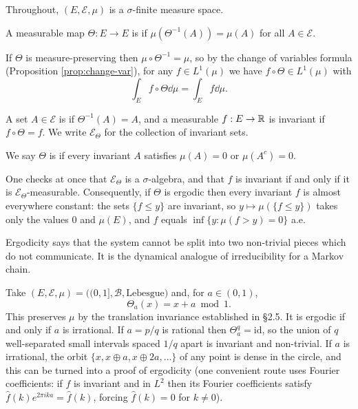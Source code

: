 \documentclass[a4paper]{scrartcl}
\newcommand{\cB}{\mathcal{B}}
\newcommand{\cE}{\mathcal{E}}
\begin{document}
Throughout, $(E,\cE,\mu)$ is a $\sigma$-finite measure space.

\begin{definition}
	A measurable map $\Theta : E \to E$ is  if $\mu(\Theta^{-1}(A))=\mu(A)$ for all $A \in \cE$.
\end{definition}

If $\Theta$ is measure-preserving then $\mu\circ\Theta^{-1}=\mu$, so by the change of variables formula (Proposition \ref{prop:change-var}), for any $f \in L^1(\mu)$ we have $f \circ \Theta \in L^1(\mu)$ with
$$
\int_E f\circ\Theta\dd\mu = \int_E f\dd\mu.
$$

\begin{definition}
	A set $A \in \cE$ is  if $\Theta^{-1}(A)=A$, and a measurable $f : E \to \mathbb{R}$ is invariant if $f\circ\Theta = f$. We write $\cE_\Theta$ for the collection of invariant sets.

	We say $\Theta$ is  if every invariant $A$ satisfies $\mu(A)=0$ or $\mu(A^c)=0$.
\end{definition}

One checks at once that $\cE_\Theta$ is a $\sigma$-algebra, and that $f$ is invariant if and only if it is $\cE_\Theta$-measurable. Consequently, if $\Theta$ is ergodic then every invariant $f$ is almost everywhere constant: the sets $\{f \leq y\}$ are invariant, so $y \mapsto \mu(\{f\leq y\})$ takes only the values $0$ and $\mu(E)$, and $f$ equals $\inf\{y : \mu(f>y)=0\}$ a.e.

Ergodicity says that the system cannot be split into two non-trivial pieces which do not communicate. It is the dynamical analogue of irreducibility for a Markov chain.

\begin{example}\label{ex:rotation}
	Take $(E,\cE,\mu)=\big((0,1],\cB,\text{Lebesgue}\big)$ and, for $a \in (0,1)$,
	$$
	\Theta_a(x) = x + a \bmod 1.
	$$
	This preserves $\mu$ by the translation invariance established in \S2.5. It is ergodic if and only if $a$ is irrational. If $a = p/q$ is rational then $\Theta_a^q = \mathrm{id}$, so the union of $q$ well-separated small intervals spaced $1/q$ apart is invariant and non-trivial. If $a$ is irrational, the orbit $\{x, x\oplus a, x\oplus 2a,\dots\}$ of any point is dense in the circle, and this can be turned into a proof of ergodicity (one convenient route uses Fourier coefficients: if $f$ is invariant and in $L^2$ then its Fourier coefficients satisfy $\hat f(k)e^{2\pi i k a}=\hat f(k)$, forcing $\hat f(k)=0$ for $k \neq 0$).
\end{example}
\end{document}
